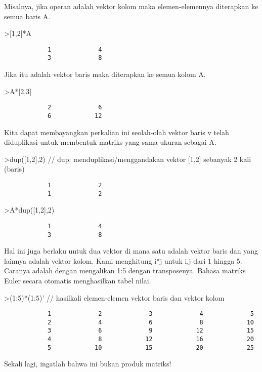 \documentclass[
]{book}
\begin{document}
Misalnya, jika operan adalah vektor kolom maka elemen-elemennya diterapkan ke semua baris A.

\textgreater{[}1,2{]}*A

\begin{verbatim}
            1             4 
            3             8 
\end{verbatim}

Jika itu adalah vektor baris maka diterapkan ke semua kolom A.

\textgreater A*{[}2,3{]}

\begin{verbatim}
            2             6 
            6            12 
\end{verbatim}

Kita dapat membayangkan perkalian ini seolah-olah vektor baris v telah diduplikasi untuk membentuk matriks yang sama ukuran sebagai A.

\textgreater dup({[}1,2{]},2) // dup: menduplikasi/menggandakan vektor {[}1,2{]} sebanyak 2 kali (baris)

\begin{verbatim}
            1             2 
            1             2 
\end{verbatim}

\textgreater A*dup({[}1,2{]},2)

\begin{verbatim}
            1             4 
            3             8 
\end{verbatim}

Hal ini juga berlaku untuk dua vektor di mana satu adalah vektor baris dan yang lainnya adalah vektor kolom. Kami menghitung i*j untuk i,j dari 1 hingga 5. Caranya adalah dengan mengalikan 1:5 dengan transposenya. Bahasa matriks Euler secara otomatis menghasilkan tabel nilai.

\textgreater(1:5)*(1:5)' // hasilkali elemen-elemen vektor baris dan vektor kolom

\begin{verbatim}
            1             2             3             4             5 
            2             4             6             8            10 
            3             6             9            12            15 
            4             8            12            16            20 
            5            10            15            20            25 
\end{verbatim}

Sekali lagi, ingatlah bahwa ini bukan produk matriks!
\end{document}

